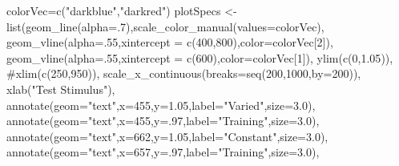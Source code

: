 \documentclass[
  letterpaper,
  DIV=11,
  numbers=noendperiod]{scrartcl}
\newenvironment{Shaded}{\begin{snugshade}}{\end{snugshade}}
\newcommand{\AttributeTok}[1]{\textcolor[rgb]{0.40,0.45,0.13}{#1}}
\newcommand{\CommentTok}[1]{\textcolor[rgb]{0.37,0.37,0.37}{#1}}
\newcommand{\DecValTok}[1]{\textcolor[rgb]{0.68,0.00,0.00}{#1}}
\newcommand{\FloatTok}[1]{\textcolor[rgb]{0.68,0.00,0.00}{#1}}
\newcommand{\FunctionTok}[1]{\textcolor[rgb]{0.28,0.35,0.67}{#1}}
\newcommand{\NormalTok}[1]{\textcolor[rgb]{0.00,0.23,0.31}{#1}}
\newcommand{\OtherTok}[1]{\textcolor[rgb]{0.00,0.23,0.31}{#1}}
\newcommand{\StringTok}[1]{\textcolor[rgb]{0.13,0.47,0.30}{#1}}
\begin{document}
\begin{Shaded}
\begin{Highlighting}[]
\NormalTok{colorVec}\OtherTok{=}\FunctionTok{c}\NormalTok{(}\StringTok{"darkblue"}\NormalTok{,}\StringTok{"darkred"}\NormalTok{)}
\NormalTok{plotSpecs }\OtherTok{\textless{}{-}} \FunctionTok{list}\NormalTok{(}\FunctionTok{geom\_line}\NormalTok{(}\AttributeTok{alpha=}\NormalTok{.}\DecValTok{7}\NormalTok{),}\FunctionTok{scale\_color\_manual}\NormalTok{(}\AttributeTok{values=}\NormalTok{colorVec),}
                  \FunctionTok{geom\_vline}\NormalTok{(}\AttributeTok{alpha=}\NormalTok{.}\DecValTok{55}\NormalTok{,}\AttributeTok{xintercept =} \FunctionTok{c}\NormalTok{(}\DecValTok{400}\NormalTok{,}\DecValTok{800}\NormalTok{),}\AttributeTok{color=}\NormalTok{colorVec[}\DecValTok{2}\NormalTok{]),}
                  \FunctionTok{geom\_vline}\NormalTok{(}\AttributeTok{alpha=}\NormalTok{.}\DecValTok{55}\NormalTok{,}\AttributeTok{xintercept =} \FunctionTok{c}\NormalTok{(}\DecValTok{600}\NormalTok{),}\AttributeTok{color=}\NormalTok{colorVec[}\DecValTok{1}\NormalTok{]),}
                  \FunctionTok{ylim}\NormalTok{(}\FunctionTok{c}\NormalTok{(}\DecValTok{0}\NormalTok{,}\FloatTok{1.05}\NormalTok{)),}
                  \CommentTok{\#xlim(c(250,950)),}
                  \FunctionTok{scale\_x\_continuous}\NormalTok{(}\AttributeTok{breaks=}\FunctionTok{seq}\NormalTok{(}\DecValTok{200}\NormalTok{,}\DecValTok{1000}\NormalTok{,}\AttributeTok{by=}\DecValTok{200}\NormalTok{)),}
                  \FunctionTok{xlab}\NormalTok{(}\StringTok{"Test Stimulus"}\NormalTok{),}
                  \FunctionTok{annotate}\NormalTok{(}\AttributeTok{geom=}\StringTok{"text"}\NormalTok{,}\AttributeTok{x=}\DecValTok{455}\NormalTok{,}\AttributeTok{y=}\FloatTok{1.05}\NormalTok{,}\AttributeTok{label=}\StringTok{"Varied"}\NormalTok{,}\AttributeTok{size=}\FloatTok{3.0}\NormalTok{),}
                  \FunctionTok{annotate}\NormalTok{(}\AttributeTok{geom=}\StringTok{"text"}\NormalTok{,}\AttributeTok{x=}\DecValTok{455}\NormalTok{,}\AttributeTok{y=}\NormalTok{.}\DecValTok{97}\NormalTok{,}\AttributeTok{label=}\StringTok{"Training"}\NormalTok{,}\AttributeTok{size=}\FloatTok{3.0}\NormalTok{),}
                  \FunctionTok{annotate}\NormalTok{(}\AttributeTok{geom=}\StringTok{"text"}\NormalTok{,}\AttributeTok{x=}\DecValTok{662}\NormalTok{,}\AttributeTok{y=}\FloatTok{1.05}\NormalTok{,}\AttributeTok{label=}\StringTok{"Constant"}\NormalTok{,}\AttributeTok{size=}\FloatTok{3.0}\NormalTok{),}
                  \FunctionTok{annotate}\NormalTok{(}\AttributeTok{geom=}\StringTok{"text"}\NormalTok{,}\AttributeTok{x=}\DecValTok{657}\NormalTok{,}\AttributeTok{y=}\NormalTok{.}\DecValTok{97}\NormalTok{,}\AttributeTok{label=}\StringTok{"Training"}\NormalTok{,}\AttributeTok{size=}\FloatTok{3.0}\NormalTok{),}

\end{Highlighting}
\end{Shaded}
\end{document}
